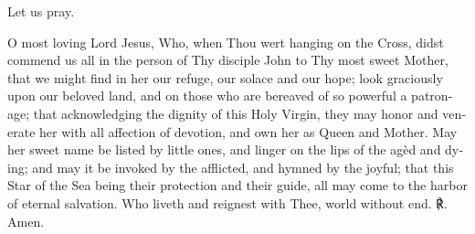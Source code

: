 \documentclass[11pt]{book}
\begin{document}
\begin{otherlanguage}{english}
Let us pray.

\lettrine{O}{} most loving Lord Jesus, Who, when Thou wert hanging on the Cross, didst commend us all in the person of Thy disciple John to Thy most sweet Mother, that we might find in her our refuge, our solace and our hope; look graciously upon our beloved land, and on those who are bereaved of so powerful a patronage; that acknowledging the dignity of this Holy Virgin, they may honor and venerate her with all affection of devotion, and own her as Queen and Mother. May her sweet name be listed by little ones, and linger on the lips of the agèd and dying; and may it be invoked by the afflicted, and hymned by the joyful; that this Star of the Sea being their protection and their guide, all may come to the harbor of eternal salvation. Who liveth and reignest with Thee, world without end. ℟. Amen.

\end{otherlanguage}

\end{document}
